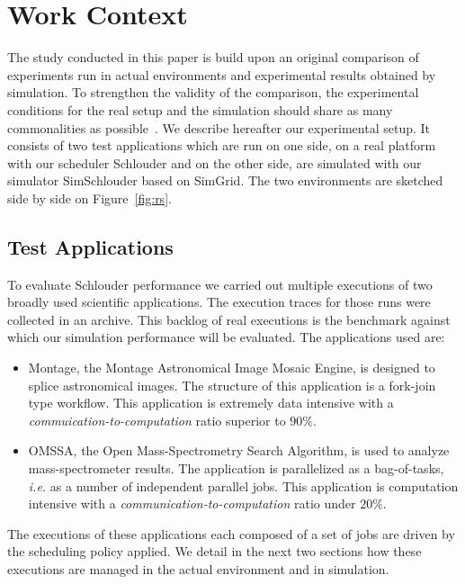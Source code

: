 \documentclass[10pt,conference,compsocconf]{IEEEtran}
\begin{document}
\section{Work Context}
\label{sec:work-context}

The  study conducted  in this  paper  is build  upon an  original comparison  of
experiments  run in  actual environments  and experimental  results obtained  by
simulation.   To strengthen  the validity  of the  comparison, the  experimental
conditions  for  the  real  setup  and  the  simulation  should  share  as  many
commonalities  as   possible~\cite{PucherGWK15}.   We  describe   hereafter  our
experimental setup.  It consists of two  test applications which are  run on one
side, on a real platform with our scheduler Schlouder and on the other side, are
simulated  with   our  simulator  SimSchlouder   based  on  SimGrid.    The  two
environments are sketched side by side on Figure~\ref{fig:rs}.

\subsection{Test Applications}\label{sc:setup}

To  evaluate Schlouder  performance we  carried out  multiple executions  of two
broadly used scientific  applications. The execution traces for  those runs were
collected  in an  archive.  This backlog  of real  executions  is the  benchmark
against which  our simulation  performance will  be evaluated.  The applications
used are:

\begin{itemize}
\item Montage\cite{montage2009},  the Montage Astronomical Image  Mosaic Engine,
  is designed to  splice astronomical images. The structure  of this application
  is a  fork-join type  workflow. This application  is extremely  data intensive
  with a \emph{commuication-to-computation} ratio superior to $90\%$.

\item OMSSA\cite{Geer2004}, the Open Mass-Spectrometry Search Algorithm, is used
  to analyze  mass-spectrometer results.  The application  is parallelized  as a
  bag-of-tasks, \textit{i.e.}  as a  number of  independent parallel  jobs. This
  application        is        computation        intensive        with        a
  \emph{communication-to-computation} ratio under $20\%$.
\end{itemize}

The executions of these applications each composed  of a set of jobs are driven
by the scheduling policy applied. We detail in the next two sections how these
executions are managed in the actual environment and in simulation.  
\end{document}
